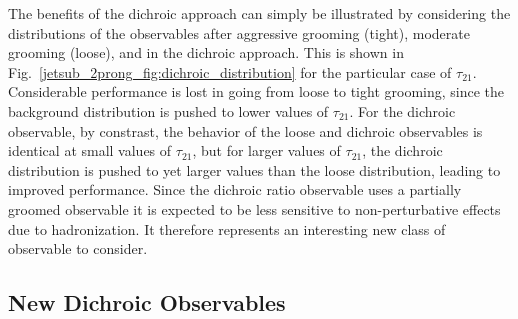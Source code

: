 \documentclass[11pt]{cernrep}
\begin{document}
The benefits of the dichroic approach can simply be illustrated by
considering the distributions of the observables after aggressive
grooming (tight), moderate grooming (loose), and in the dichroic
approach.
%
This is shown in Fig.~\ref{jetsub_2prong_fig:dichroic_distribution} for the particular case of $\tau_{21}$.
%
Considerable performance is lost in going from loose to tight grooming, since the background distribution is pushed to lower values of $\tau_{21}$.
%
For the dichroic observable, by constrast, the behavior of the loose
and dichroic observables is identical at small values of $\tau_{21}$,
but for larger values of $\tau_{21}$, the dichroic distribution is
pushed to yet larger values than the loose distribution, leading to
improved performance.
%
%
Since the dichroic ratio observable uses a partially groomed
observable
it is expected to be less sensitive to non-perturbative effects due to hadronization.
%
It therefore represents an interesting new class of observable to consider. 

\subsection{New Dichroic Observables}\label{jetsub_2prong_sec:dichroic_new}
\end{document}
